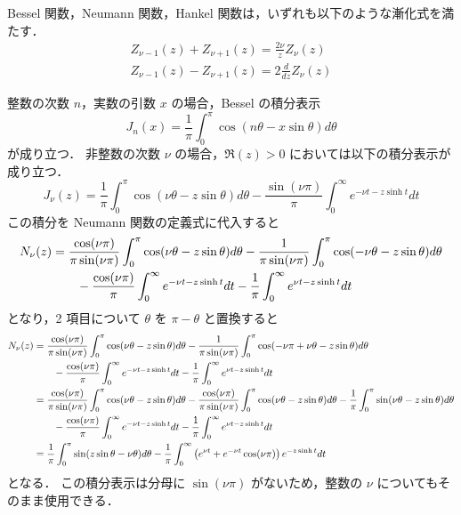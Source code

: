 Bessel 関数，Neumann 関数，Hankel 関数は，いずれも以下のような漸化式を満たす．
\begin{gather}
    Z_{\nu - 1}(z) + Z_{\nu + 1}(z) = \frac{2\nu}{z} Z_{\nu}(z) \\
    Z_{\nu - 1}(z) - Z_{\nu + 1}(z) = 2 \frac{d}{dz} Z_{\nu}(z)
\end{gather}

整数の次数 $n$，実数の引数 $x$ の場合，Bessel の積分表示
\begin{equation}
    J_n(x) = \frac{1}{\pi} \int_0^\pi \cos(n \theta - x \sin\theta) d\theta
\end{equation}
が成り立つ．
非整数の次数 $\nu$ の場合，$\Re(z) > 0$ においては以下の積分表示が成り立つ．
\begin{equation}
    J_{\nu}(z) = \frac{1}{\pi} \int_0^\pi \cos(\nu \theta - z \sin \theta) d\theta
    - \frac{\sin(\nu \pi)}{\pi} \int_0^\infty e^{-\nu t -z \sinh{t}} dt
\end{equation}
この積分を Neumann 関数の定義式に代入すると
\begin{align}
    N_{\nu}(z)
     & =
    \frac{\cos(\nu \pi)}{\pi \sin(\nu \pi)} \int_0^\pi \cos(\nu \theta - z \sin \theta) d\theta
    - \frac{1}{\pi \sin(\nu \pi)} \int_0^\pi \cos(-\nu \theta - z \sin \theta) d\theta
    \notag \\ &\hspace{2em}
    - \frac{\cos(\nu \pi)}{\pi} \int_0^\infty e^{-\nu t -z \sinh{t}} dt
    - \frac{1}{\pi} \int_0^\infty e^{\nu t -z \sinh{t}} dt
\end{align}
となり，2 項目について $\theta$ を $\pi - \theta$ と置換すると
\begin{align}
    N_{\nu}(z)
     & =
    \frac{\cos(\nu \pi)}{\pi \sin(\nu \pi)} \int_0^\pi \cos(\nu \theta - z \sin \theta) d\theta
    - \frac{1}{\pi \sin(\nu \pi)} \int_0^\pi \cos(-\nu \pi + \nu \theta - z \sin \theta) d\theta
    \notag \\ &\hspace{2em}
    - \frac{\cos(\nu \pi)}{\pi} \int_0^\infty e^{-\nu t -z \sinh{t}} dt
    - \frac{1}{\pi} \int_0^\infty e^{\nu t -z \sinh{t}} dt
    \\
     & =
    \frac{\cos(\nu \pi)}{\pi \sin(\nu \pi)} \int_0^\pi \cos(\nu \theta - z \sin \theta) d\theta
    - \frac{\cos(\nu \pi)}{\pi \sin(\nu \pi)} \int_0^\pi \cos(\nu \theta - z \sin \theta) d\theta
    - \frac{1}{\pi} \int_0^\pi \sin(\nu \theta - z \sin \theta) d\theta
    \notag \\ &\hspace{2em}
    - \frac{\cos(\nu \pi)}{\pi} \int_0^\infty e^{-\nu t -z \sinh{t}} dt
    - \frac{1}{\pi} \int_0^\infty e^{\nu t -z \sinh{t}} dt
    \\
     & =
    \frac{1}{\pi} \int_0^\pi \sin(z \sin \theta - \nu \theta) d\theta
    - \frac{1}{\pi} \int_0^\infty \left(e^{\nu t} + e^{-\nu t} \cos(\nu \pi)\right) e^{-z \sinh{t}} dt
\end{align}
となる．
この積分表示は分母に $\sin(\nu \pi)$ がないため，整数の $\nu$ についてもそのまま使用できる．

